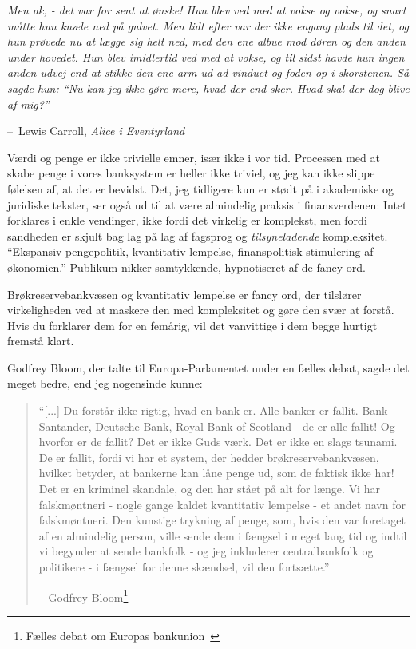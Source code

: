\documentclass[paper=6in:9in,pagesize=pdftex,
               headinclude=on,footinclude=on,12pt]{scrbook}
\makeatletter
\newenvironment{chapquote}[2][4em]{\setlength{\@tempdima}{#1}%
   \def\chapquote@author{#2}%
   \parshape 1 \@tempdima \dimexpr\textwidth-2\@tempdima\relax%
   \itshape}{\par\normalfont\hfill--\ \chapquote@author\hspace*{\@tempdima}\par\bigskip}
\makeatother
\begin{document}
\begin{chapquote}{Lewis Carroll, \textit{Alice i Eventyrland}} Men ak, - det var for sent at ønske! Hun blev ved med at vokse og vokse, og snart måtte hun knæle ned på gulvet. Men lidt efter var der ikke engang plads til det, og hun prøvede nu at lægge sig helt ned, med den ene albue mod døren og den anden under hovedet. Hun blev imidlertid ved med at vokse, og til sidst havde hun ingen anden udvej end at stikke den ene arm ud ad vinduet og foden op i skorstenen. Så sagde hun: \enquote{Nu kan jeg ikke gøre mere, hvad der end sker. Hvad skal der dog blive af mig?} \end{chapquote}

Værdi og penge er ikke trivielle emner, især ikke i vor tid. Processen med at skabe penge i vores banksystem er heller ikke triviel, og jeg kan ikke slippe følelsen af, at det er bevidst. Det, jeg tidligere kun er stødt på i akademiske og juridiske tekster, ser også ud til at være almindelig praksis i finansverdenen: Intet forklares i enkle vendinger, ikke fordi det virkelig er komplekst, men fordi sandheden er skjult bag lag på lag af fagsprog og \textit{tilsyneladende} kompleksitet. \enquote{Ekspansiv pengepolitik, kvantitativ lempelse, finanspolitisk stimulering af økonomien.} Publikum nikker samtykkende, hypnotiseret af de fancy ord.

Brøkreservebankvæsen og kvantitativ lempelse er fancy ord, der tilslører virkeligheden ved at maskere den med kompleksitet og gøre den svær at forstå. Hvis du forklarer dem for en femårig, vil det vanvittige i dem begge hurtigt fremstå klart.

Godfrey Bloom, der talte til Europa-Parlamentet under en fælles debat, sagde det meget bedre, end jeg nogensinde kunne:\begin{quotation}\begin{samepage} \enquote{[...] Du forstår ikke rigtig, hvad en bank er. Alle banker er fallit. Bank Santander, Deutsche Bank, Royal Bank of Scotland - de er alle fallit! Og hvorfor er de fallit? Det er ikke Guds værk. Det er ikke en slags tsunami. De er fallit, fordi vi har et system, der hedder brøkreservebankvæsen, hvilket betyder, at bankerne kan låne penge ud, som de faktisk ikke har! Det er en kriminel skandale, og den har stået på alt for længe. \href{...}{} Vi har falskmøntneri - nogle gange kaldet kvantitativ lempelse - et andet navn for falskmøntneri. Den kunstige trykning af penge, som, hvis den var foretaget af en almindelig person, ville sende dem i fængsel i meget lang tid \href{...}{} og indtil vi begynder at sende bankfolk - og jeg inkluderer centralbankfolk og politikere - i fængsel for denne skændsel, vil den fortsætte.} \begin{flushright} -- Godfrey Bloom\footnote{Fælles debat om Europas bankunion~\cite{godfrey-bloom}}
\end{flushright}\end{samepage}\end{quotation}
\end{document}
